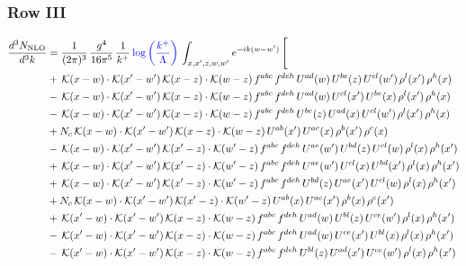 \documentclass[9pt]{article}
\numberwithin{equation}{section}
\begin{document}
 \subsubsection{Row III}
 \begin{align}
\frac{d^{3}N_{\mathrm{NLO}}}{d^{3}k} & = \frac{1}{(2\pi)^{3}}\,\frac{g^{4}}{16\pi^{5}}\,\frac{1}{k^{+}}\,{\color{blue}\log{\left(\frac{k^{+}}{\Lambda}\right)}}\,\int_{x,x',z,w,w'}e^{-ik(w-w')}\,\Bigg[\notag\\ &  +\,\mathcal{K}(x-w)\cdot\mathcal{K}(x'-w')\,\mathcal{K}(x-z)\cdot\mathcal{K}(w-z)\,f^{abc}\,f^{deh}\,U^{ad}(w)\,U^{be}(z)\,U^{cl}(w')\,\rho^{l}(x')\,\rho^{h}(x)\notag\\
& -\,\mathcal{K}(x-w)\cdot\mathcal{K}(x'-w')\,\mathcal{K}(x-z)\cdot\mathcal{K}(w-z)\,f^{abc}\,f^{deh}\,U^{ad}(w)\,U^{cl}(x')\,U^{be}(x)\,\rho^{l}(x')\,\rho^{h}(x)\notag\\
& -\,\mathcal{K}(x-w)\cdot\mathcal{K}(x'-w')\,\mathcal{K}(x-z)\cdot\mathcal{K}(w-z)\,f^{abc}\,f^{deh}\,U^{be}(z)\,U^{ad}(x)\,U^{cl}(w')\,\rho^{l}(x')\,\rho^{h}(x)\notag\\
& +N_{c}\,\mathcal{K}(x-w)\cdot\mathcal{K}(x'-w')\,\mathcal{K}(x-z)\cdot\mathcal{K}(w-z)\,U^{ab}(x')\,U^{ac}(x)\,\rho^{b}(x')\,\rho^{c}(x)\notag\\
& -\,\mathcal{K}(x-w)\cdot\mathcal{K}(x'-w')\,\mathcal{K}(x'-z)\cdot\mathcal{K}(w'-z)\,f^{abc}\,f^{deh}\,U^{ae}(w')\,U^{bd}(z)\,U^{cl}(w)\,\rho^{l}(x)\,\rho^{h}(x')\notag\\
& +\,\mathcal{K}(x-w)\cdot\mathcal{K}(x'-w')\,\mathcal{K}(x'-z)\cdot\mathcal{K}(w'-z)\,f^{abc}\,f^{deh}\,U^{ae}(w')\,U^{cl}(x)\,U^{bd}(x')\,\rho^{l}(x)\,\rho^{h}(x')\notag\\
& +\,\mathcal{K}(x-w)\cdot\mathcal{K}(x'-w')\,\mathcal{K}(x'-z)\cdot\mathcal{K}(w'-z)\,f^{abc}\,f^{deh}\,U^{bd}(z)\,U^{ae}(x')\,U^{cl}(w)\,\rho^{l}(x)\,\rho^{h}(x')\notag\\
& +N_{c}\,\mathcal{K}(x-w)\cdot\mathcal{K}(x'-w')\,\mathcal{K}(x'-z)\cdot\mathcal{K}(w'-z)\,U^{ab}(x)\,U^{ac}(x')\,\rho^{b}(x)\,\rho^{c}(x')\notag\\
& +\,\mathcal{K}(x'-w)\cdot\mathcal{K}(x'-w')\,\mathcal{K}(x-z)\cdot\mathcal{K}(w-z)\,f^{abc}\,f^{deh}\,U^{ad}(w)\,U^{bl}(z)\,U^{ce}(w')\,\rho^{l}(x)\,\rho^{h}(x')\notag\\
& -\,\mathcal{K}(x'-w)\cdot\mathcal{K}(x'-w')\,\mathcal{K}(x-z)\cdot\mathcal{K}(w-z)\,f^{abc}\,f^{deh}\,U^{ad}(w)\,U^{ce}(x')\,U^{bl}(x)\,\rho^{l}(x)\,\rho^{h}(x')\notag\\
& -\,\mathcal{K}(x'-w)\cdot\mathcal{K}(x'-w')\,\mathcal{K}(x-z)\cdot\mathcal{K}(w-z)\,f^{abc}\,f^{deh}\,U^{bl}(z)\,U^{ad}(x')\,U^{ce}(w')\,\rho^{l}(x)\,\rho^{h}(x')\notag\\

\end{align}
\end{document}
